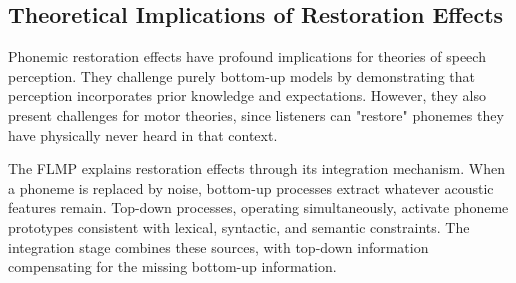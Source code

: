 \documentclass[12pt,a4paper]{article}
\begin{document}
\subsection{Theoretical Implications of Restoration Effects}

Phonemic restoration effects have profound implications for theories of speech perception. They challenge purely bottom-up models by demonstrating that perception incorporates prior knowledge and expectations. However, they also present challenges for motor theories, since listeners can "restore" phonemes they have physically never heard in that context.

The FLMP explains restoration effects through its integration mechanism. When a phoneme is replaced by noise, bottom-up processes extract whatever acoustic features remain. Top-down processes, operating simultaneously, activate phoneme prototypes consistent with lexical, syntactic, and semantic constraints. The integration stage combines these sources, with top-down information compensating for the missing bottom-up information.
\end{document}
